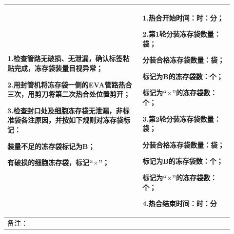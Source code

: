\documentclass[UTF8,10pt,a4paper,fontset=fandol]{ctexart}
\begin{document}
\begin{center}
\small
\begin{tabular}{|p{0.55\linewidth}|p{0.37\linewidth}|}
\hline
1.检查管路无破损、无泄漏，确认标签粘贴完成，冻存袋装量目视异常；\par
2.用封管机将冻存袋一侧的EVA管路热合三次，用剪刀将第二次热合处位置剪开；\par
3.检查封口处及细胞冻存袋无泄漏，非标准袋各注原因，并按如下规则对冻存袋标记：\par
\hspace{1em}装量不足的冻存袋标记为B；\par
\hspace{1em}有破损的细胞冻存袋，标记“$\times$”；
&
1.热合开始时间：\underline{\hspace{0.6cm}}时：\underline{\hspace{0.6cm}}分；\par
2.第1轮分装冻存袋数量：\underline{\hspace{0.6cm}}袋；\par
\hspace{1em}分装合格冻存袋数量：\underline{\hspace{0.6cm}}袋；\par
\hspace{1em}标记为B的冻存袋数：\underline{\hspace{0.6cm}}个；\par
\hspace{1em}标记为“$\times$”的冻存袋数：\underline{\hspace{0.6cm}}个；\par
3.第2轮分装冻存袋数量：\underline{\hspace{0.6cm}}袋；\par
\hspace{1em}分装合格冻存袋数量：\underline{\hspace{0.6cm}}袋；\par
\hspace{1em}标记为B的冻存袋数：\underline{\hspace{0.6cm}}个；\par
\hspace{1em}标记为“$\times$”的冻存袋数：\underline{\hspace{0.6cm}}个；\par
4.热合结束时间：\underline{\hspace{0.6cm}}时：\underline{\hspace{0.6cm}}分
\tabularnewline
\hline
备注：
&
\tabularnewline
\hline
\end{tabular}
\end{center}
\end{document}
